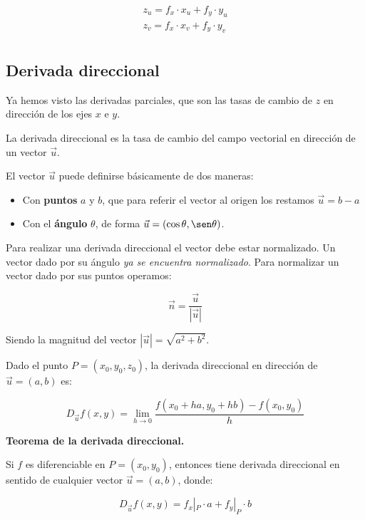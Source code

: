 \begin{align*}
    z_u = f_x\cdot x_u + f_y \cdot y_u \\
    z_v = f_x\cdot x_v + f_y \cdot y_v \\
\end{align*}

\subsection{Derivada direccional}

Ya hemos visto las derivadas parciales,
que son las tasas de cambio de \(z\) en dirección de los ejes \(x\) e \(y\).

La derivada direccional es la tasa de cambio del campo vectorial en dirección
de un vector \(\vec{u}\).

El vector \(\vec{u}\) puede definirse básicamente de dos maneras:
\begin{itemize}
    \item Con \textbf{puntos} \(a\) y \(b\),
          que para referir el vector al origen los restamos \(\vec{u} = b-a\)
    \item Con el \textbf{ángulo} \(\theta\),
          de forma \(\vec{u} = (\cos \theta, \sen \theta)\).
\end{itemize}

Para realizar una derivada direccional el vector debe estar normalizado.
Un vector dado por su ángulo \textit{ya se encuentra normalizado}.
Para normalizar un vector dado por sus puntos operamos:

\begin{equation*}
    \vec{n} = \frac{\vec{u}}{|\vec{u}|}
\end{equation*}

Siendo la magnitud del vector \(|\vec{u}| = \sqrt{a^{2} + b^{2}}\).

Dado el punto \(P = (x_0, y_0, z_0)\),
la derivada direccional en dirección de \(\vec{u} = (a,b)\) es:

\begin{equation*}
    D_{\vec{u}}f(x,y) = \lim_{h \to 0}
    \frac{f(x_0 + ha, y_0 + hb) - f(x_0,y_0)}{h}
\end{equation*}

\textbf{Teorema de la derivada direccional.}

Si \(f\) es diferenciable en \(P = (x_0,y_0)\),
entonces tiene derivada direccional en sentido de cualquier vector
\(\vec{u} = (a,b)\), donde:

\begin{equation*}
    D_{\vec{u}}f(x,y) = f_x|_{P} \cdot a + f_y|_{P} \cdot b
\end{equation*}

